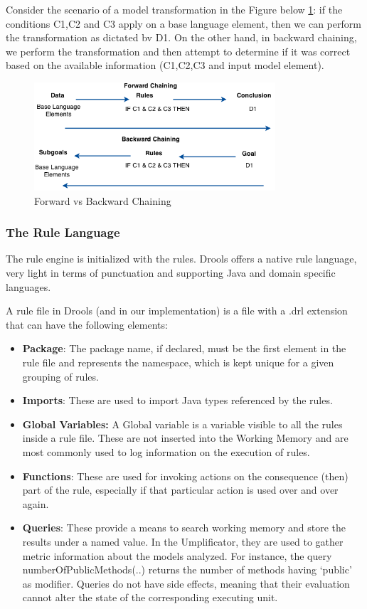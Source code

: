 Consider the scenario of a model transformation in the Figure below \ref{fig:backwardForward}: if the conditions C1,C2 and C3 apply on a base language element, then we can perform the transformation as dictated bv D1. 
On the other hand, in backward chaining, we perform the transformation and then attempt to determine if it was correct based on the available information (C1,C2,C3 and input model element).

\begin{figure}[h]
\centering
\includegraphics[width=0.80\textwidth]{Figures/ForwardBackwardChaining.png}
\caption{Forward vs Backward Chaining}
\label{fig:backwardForward}
\end{figure}

\subsubsection{The Rule Language}
The rule engine is initialized with the rules. Drools offers a native rule language, very light in terms of punctuation and supporting Java and domain specific languages. 

A rule file in Drools (and in our implementation) is a file with a .drl extension that can have the following elements:

\begin{itemize}
\item \textbf{Package}: The package name, if declared, must be the first element in the rule file and represents the namespace, which is kept unique for a given grouping of rules.
\item \textbf{Imports}: These are used to import Java types referenced by the rules.
\item \textbf{Global Variables:} A Global variable is a variable visible to all the rules inside a rule file. These are not inserted into the Working Memory and are most commonly used to log information on the execution of rules.
\item \textbf{Functions}: These are used for invoking actions on the consequence (then) part of the rule, especially if that particular action is used over and over again. 
\item \textbf{Queries}: These provide a means to search working memory and store the results under a named value. In the Umplificator, they are used to gather metric information about the models analyzed. For instance, the query  numberOfPublicMethods(..) returns the number of methods having `public' as modifier. Queries do not have side effects, meaning that their evaluation cannot alter the state of the corresponding executing unit. 
\end{itemize}

